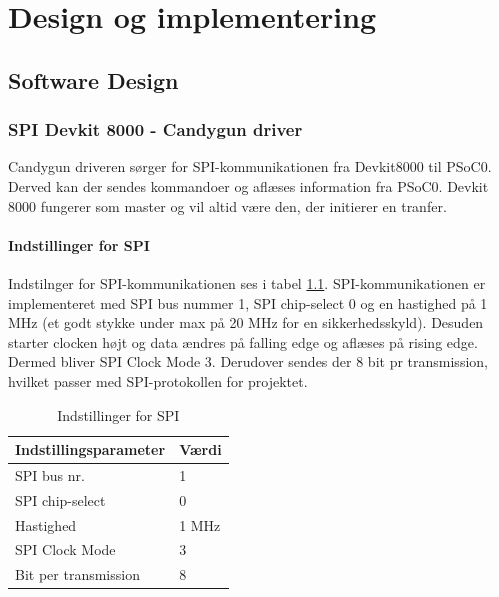 \chapter{Design og implementering}

\section{Software Design}

\subsection{SPI Devkit 8000 - Candygun driver}

Candygun driveren sørger for SPI-kommunikationen fra Devkit8000 til PSoC0. Derved kan der sendes kommandoer og aflæses information fra PSoC0. Devkit 8000 fungerer som master og vil altid være den, der initierer en tranfer. 

\subsubsection{Indstillinger for SPI}
Indstilnger for SPI-kommunikationen ses i tabel \ref{SPItabel}. SPI-kommunikationen er implementeret med SPI bus nummer 1, SPI chip-select 0 og en hastighed på 1 MHz (et godt stykke under max på 20 MHz for en sikkerhedsskyld). Desuden starter clocken højt og data ændres på falling edge og aflæses på rising edge. Dermed bliver SPI Clock Mode 3. Derudover sendes der 8 bit pr transmission, hvilket passer med SPI-protokollen for projektet.\\

\begin{table}[H]
	\centering
	\caption{Indstillinger for SPI}
	\label{SPItabel}
	\begin{tabular}{|l|l|}
		\hline
		\textbf{Indstillingsparameter} & \textbf{Værdi} \\ \hline
		SPI bus nr.                    & 1              \\ \hline
		SPI chip-select                & 0              \\ \hline
		Hastighed                      & 1 MHz          \\ \hline
		SPI Clock Mode                 & 3              \\ \hline
		Bit per transmission           & 8              \\ \hline
	\end{tabular}
\end{table}


